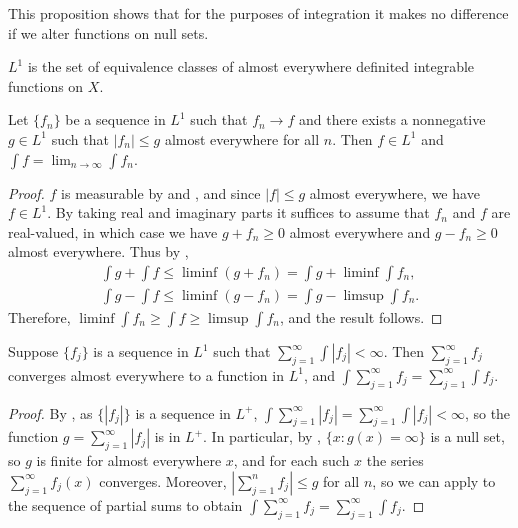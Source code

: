 This proposition shows that for the purposes of integration it makes no difference if we alter functions on null sets.

\begin{definition}
    $L^1$ is the set of equivalence classes of almost everywhere definited integrable functions on $X$.
\end{definition}

\begin{theorem}
    Let $\{ f_n \}$ be a sequence in $L^1$ such that $f_n \to f$ and there exists a nonnegative $g \in L^1$ such that $|f_n| \le g$ almost everywhere for all $n$. Then $f \in L^1$ and $\int f = \lim_{n \to \infty} \int f_n$.
\end{theorem}

\begin{proof}
    $f$ is measurable by  and , and since $|f| \le g$ almost everywhere, we have $f \in L^1$.
    By taking real and imaginary parts it suffices to assume that $f_n$ and $f$ are real-valued, in which case we have $g+f_n \ge 0$ almost everywhere and $g - f_n \ge 0$ almost everywhere.
    Thus by ,
    \begin{align}
        \int g + \int f \le \liminf (g+f_n) = \int g + \liminf \int f_n, \\
        \int g - \int f \le \liminf (g-f_n) = \int g - \limsup \int f_n.
    \end{align}
    Therefore, $\liminf \int f_n \ge \int f \ge \limsup \int f_n$, and the result follows.
\end{proof}

\begin{theorem}
    Suppose $\{ f_j \}$ is a sequence in $L^1$ such that $\sum_{j=1}^{\infty} \int |f_j| < \infty$.
    Then $\sum_{j=1}^{\infty} f_j$ converges almost everywhere to a function in $L^1$, and $\int \sum_{j=1}^{\infty} f_j = \sum_{j=1}^{\infty} \int f_j$.
\end{theorem}

\begin{proof}
    By , as $\{|f_j|\}$ is a sequence in $L^+$, $\int \sum_{j=1}^{\infty} |f_j| = \sum_{j=1}^{\infty} \int |f_j| < \infty$, so the function $g = \sum_{j=1}^{\infty} |f_j|$ is in $L^+$. 
    In particular, by , $\{ x: g(x) = \infty \}$ is a null set, so $g$ is finite for almost everywhere $x$, and for each such $x$ the series $\sum_{j=1}^{\infty} f_j(x)$ converges.
    Moreover, $|\sum_{j=1}^{n} f_j| \le g$ for all $n$, so we can apply  to the sequence of partial sums to obtain $\int \sum_{j=1}^{\infty} f_j = \sum_{j=1}^{\infty} \int f_j$.
\end{proof}

